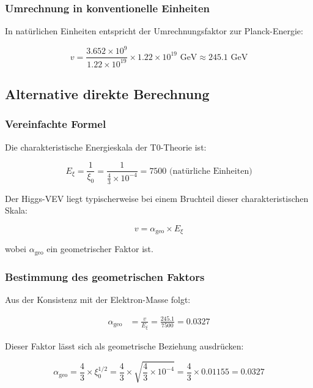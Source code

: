\subsubsection{Umrechnung in konventionelle Einheiten}

In natürlichen Einheiten entspricht der Umrechnungsfaktor zur Planck-Energie:

\begin{equation}
	v = \frac{3.652 \times 10^9}{1.22 \times 10^{19}} \times 1.22 \times 10^{19} \text{ GeV} \approx 245.1 \text{ GeV}
\end{equation}

\subsection{Alternative direkte Berechnung}

\subsubsection{Vereinfachte Formel}

Die charakteristische Energieskala der T0-Theorie ist:

\begin{equation}
	E_\xi = \frac{1}{\xi_0} = \frac{1}{\frac{4}{3} \times 10^{-4}} = 7500 \text{ (natürliche Einheiten)}
\end{equation}

Der Higgs-VEV liegt typischerweise bei einem Bruchteil dieser charakteristischen Skala:

\begin{equation}
	v = \alpha_{\text{geo}} \times E_\xi
\end{equation}

wobei $\alpha_{\text{geo}}$ ein geometrischer Faktor ist.

\subsubsection{Bestimmung des geometrischen Faktors}

Aus der Konsistenz mit der Elektron-Masse folgt:

\begin{align}
	\alpha_{\text{geo}} &= \frac{v}{E_\xi} = \frac{245.1}{7500} = 0.0327
\end{align}

Dieser Faktor lässt sich als geometrische Beziehung ausdrücken:

\begin{equation}
	\alpha_{\text{geo}} = \frac{4}{3} \times \xi_0^{1/2} = \frac{4}{3} \times \sqrt{\frac{4}{3} \times 10^{-4}} = \frac{4}{3} \times 0.01155 = 0.0327
\end{equation}

